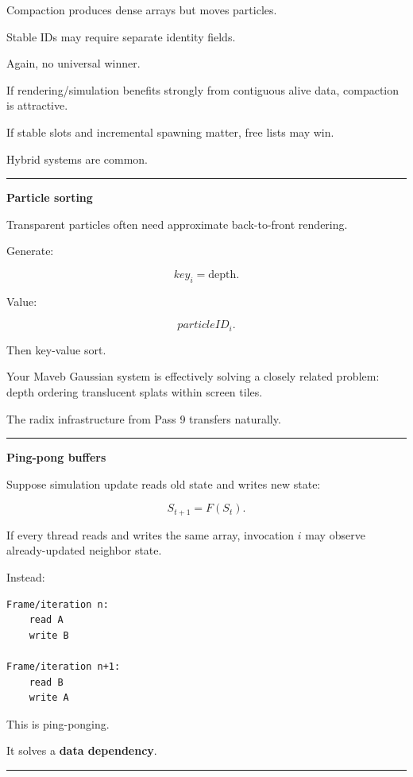 Compaction produces dense arrays but moves particles.

Stable IDs may require separate identity fields.

Again, no universal winner.

If rendering/simulation benefits strongly from contiguous alive data, compaction is attractive.

If stable slots and incremental spawning matter, free lists may win.

Hybrid systems are common.

\begin{center}\rule{0.5\linewidth}{0.5pt}\end{center}

\textbf{Particle sorting}

Transparent particles often need approximate back-to-front rendering.

Generate:

\[
key_i=
\text{depth}.
\]

Value:

\[
particleID_i.
\]

Then key-value sort.

Your Maveb Gaussian system is effectively solving a closely related problem: depth ordering translucent splats within screen tiles.

The radix infrastructure from Pass 9 transfers naturally.

\begin{center}\rule{0.5\linewidth}{0.5pt}\end{center}

\textbf{Ping-pong buffers}

Suppose simulation update reads old state and writes new state:

\[
S_{t+1}=F(S_t).
\]

If every thread reads and writes the same array, invocation \(i\) may observe already-updated neighbor state.

Instead:

\protect{}\label{p10-pingpong}%
\begin{verbatim}
Frame/iteration n:
    read A
    write B

Frame/iteration n+1:
    read B
    write A
\end{verbatim}

This is ping-ponging.

It solves a \textbf{data dependency}.

\begin{center}\rule{0.5\linewidth}{0.5pt}\end{center}

